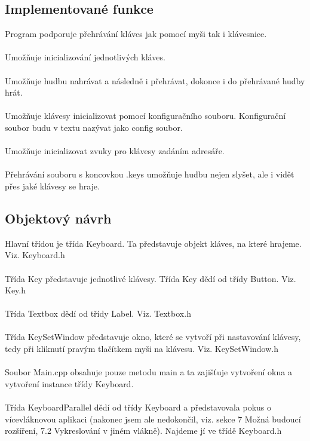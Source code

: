 \documentclass[12pt]{article}
\begin{document}
	\subsection{Implementované funkce}
	Program podporuje přehrávání kláves jak pomocí myši tak i klávesnice. 
	\\
	\\
	Umožňuje inicializování jednotlivých kláves.
	\\
	\\
	Umožňuje hudbu nahrávat a následně i přehrávat, dokonce i do přehrávané hudby hrát. 
	\\
	\\
	Umožňuje klávesy inicializovat pomocí konfiguračního souboru. Konfigurační soubor budu v textu nazývat jako config soubor.
	\\
	\\
	Umožňuje inicializovat zvuky pro klávesy zadáním adresáře.
	\\
	\\
	Přehrávání souboru s koncovkou .keys umožňuje hudbu nejen slyšet, ale i vidět přes jaké klávesy se hraje.
	
	\newpage
	\subsection{Objektový návrh}
	Hlavní třídou je třída Keyboard. Ta představuje objekt kláves, na které hrajeme. Viz. Keyboard.h
	\\	
	\\
	Třída Key představuje jednotlivé klávesy. Třída Key dědí od třídy Button. Viz. Key.h
	\\
	\\
	Třída Textbox dědí od třídy Label. Viz. Textbox.h
	\\
	\\
	Třída KeySetWindow představuje okno, které se vytvoří při nastavování klávesy, tedy při kliknutí pravým tlačítkem myši na klávesu. Viz. KeySetWindow.h
	\\
	\\
	Soubor Main.cpp obsahuje pouze metodu main a ta zajišťuje vytvoření okna a vytvoření instance třídy Keyboard.
	\\
	\\ 
	Třída KeyboardParallel dědí od třídy Keyboard a představovala pokus o vícevláknovou aplikaci (nakonec jsem ale nedokončil, viz. sekce 7 Možná budoucí rozšíření, 7.2 Vykreslování v jiném vlákně). Najdeme jí ve třídě Keyboard.h
	
	\newpage
\end{document}
